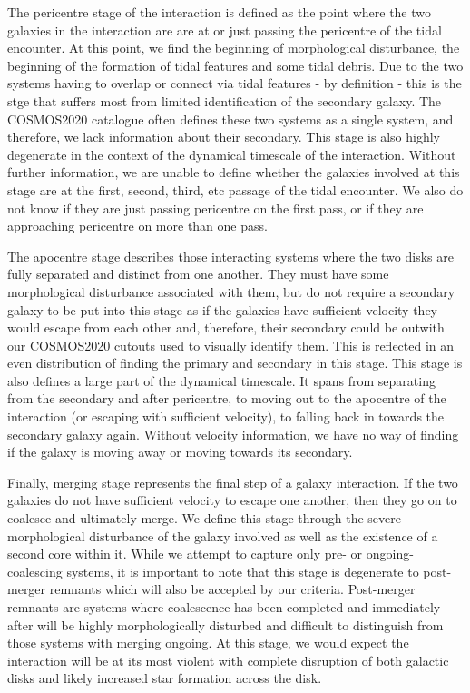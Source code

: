 The pericentre stage of the interaction is defined as the point where the two galaxies in the interaction are are at or just passing the pericentre of the tidal encounter. At this point, we find the beginning of morphological disturbance, the beginning of the formation of tidal features and some tidal debris. Due to the two systems having to overlap or connect via tidal features - by definition - this is the stge that suffers most from limited identification of the secondary galaxy. The COSMOS2020 catalogue often defines these two systems as a single system, and therefore, we lack information about their secondary. This stage is also highly degenerate in the context of the dynamical timescale of the interaction. Without further information, we are unable to define whether the galaxies involved at this stage are at the first, second, third, etc passage of the tidal encounter. We also do not know if they are just passing pericentre on the first pass, or if they are approaching pericentre on more than one pass.

The apocentre stage describes those interacting systems where the two disks are fully separated and distinct from one another. They must have some morphological disturbance associated with them, but do not require a secondary galaxy to be put into this stage as if the galaxies have sufficient velocity they would escape from each other and, therefore, their secondary could be outwith our COSMOS2020 cutouts used to visually identify them. This is reflected in an even distribution of finding the primary and secondary in this stage. This stage is also defines a large part of the dynamical timescale. It spans from separating from the secondary and after pericentre, to moving out to the apocentre of the interaction (or escaping with sufficient velocity), to falling back in towards the secondary galaxy again. Without velocity information, we have no way of finding if the galaxy is moving away or moving towards its secondary.

Finally, merging stage represents the final step of a galaxy interaction. If the two galaxies do not have sufficient velocity to escape one another, then they go on to coalesce and ultimately merge. We define this stage through the severe morphological disturbance of the galaxy involved as well as the existence of a second core within it. While we attempt to capture only pre- or ongoing-coalescing systems, it is important to note that this stage is degenerate to post-merger remnants which will also be accepted by our criteria. Post-merger remnants are systems where coalescence has been completed and immediately after will be highly morphologically disturbed and difficult to distinguish from those systems with merging ongoing. At this stage, we would expect the interaction will be at its most violent with complete disruption of both galactic disks and likely increased star formation across the disk. 

